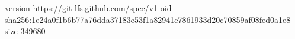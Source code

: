 version https://git-lfs.github.com/spec/v1
oid sha256:1e24a0f1b6b77a76dda37183e53f1a82941e7861933d20c70859af08fed0a1e8
size 349680

